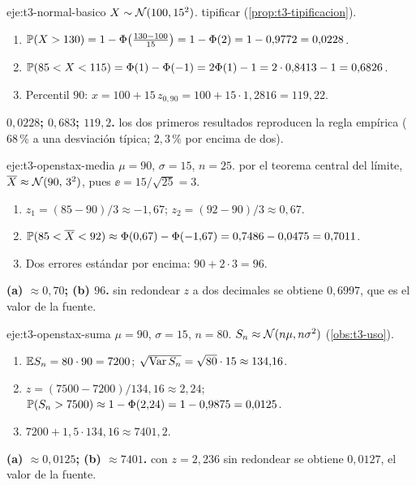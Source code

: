 \begin{solucion}{eje:t3-normal-basico}
\datos $X\sim\mathcal{N}(100,15^{2})$.
\planteamiento tipificar (\cref{prop:t3-tipificacion}).
\pasos
\begin{enumerate}[label=\arabic*.]
  \item $\mathbb{P}(X>130)=1-\Phi\bigl(\frac{130-100}{15}\bigr)=1-\Phi(2)=1-0{,}9772=0{,}0228$.
  \item $\mathbb{P}(85<X<115)=\Phi(1)-\Phi(-1)=2\Phi(1)-1=2\cdot0{,}8413-1=0{,}6826$.
  \item Percentil $90$: $x=100+15\,z_{0{,}90}=100+15\cdot1{,}2816=119{,}22$.
\end{enumerate}
\resultado \textbf{$0{,}0228$; $0{,}683$; $119{,}2$.}
\comprobacion los dos primeros resultados reproducen la regla empírica ($68\,\%$ a una desviación típica; $2{,}3\,\%$ por encima de dos).
\end{solucion}

\begin{solucion}{eje:t3-openstax-media}
\datos $\mu=90$, $\sigma=15$, $n=25$.
\planteamiento por el teorema central del límite, $\overline{X}\approx\mathcal{N}(90,\,3^{2})$, pues $\ee=15/\sqrt{25}=3$.
\pasos
\begin{enumerate}[label=\arabic*.]
  \item $z_1=(85-90)/3\approx-1{,}67$; $z_2=(92-90)/3\approx0{,}67$.
  \item $\mathbb{P}(85<\overline{X}<92)\approx\Phi(0{,}67)-\Phi(-1{,}67)=0{,}7486-0{,}0475=0{,}7011$.
  \item Dos errores estándar por encima: $90+2\cdot3=96$.
\end{enumerate}
\resultado \textbf{(a) $\approx0{,}70$; (b) $96$.}
\comprobacion sin redondear $z$ a dos decimales se obtiene $0{,}6997$, que es el valor de la fuente.
\end{solucion}

\begin{solucion}{eje:t3-openstax-suma}
\datos $\mu=90$, $\sigma=15$, $n=80$.
\planteamiento $S_n\approx\mathcal{N}(n\mu,n\sigma^{2})$ (\cref{obs:t3-uso}).
\pasos
\begin{enumerate}[label=\arabic*.]
  \item $\mathbb{E} S_n=80\cdot90=7200$; $\sqrt{\operatorname{Var} S_n}=\sqrt{80}\cdot15\approx134{,}16$.
  \item $z=(7500-7200)/134{,}16\approx2{,}24$; $\mathbb{P}(S_n>7500)\approx1-\Phi(2{,}24)=1-0{,}9875=0{,}0125$.
  \item $7200+1{,}5\cdot134{,}16\approx7401{,}2$.
\end{enumerate}
\resultado \textbf{(a) $\approx0{,}0125$; (b) $\approx7401$.}
\comprobacion con $z=2{,}236$ sin redondear se obtiene $0{,}0127$, el valor de la fuente.
\end{solucion}

